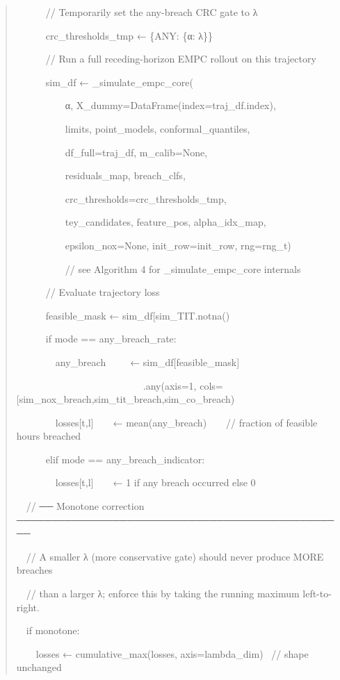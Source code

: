 \documentclass[11pt]{article}
\begin{document}
\begin{quote}
~~~~~~// Temporarily set the any-breach CRC gate to λ

~~~~~~crc\_thresholds\_tmp ← \{\textquotesingle ANY\textquotesingle:
\{α: λ\}\}

~~~~~~// Run a full receding-horizon EMPC rollout on this trajectory

~~~~~~sim\_df ← \_simulate\_empc\_core(

~~~~~~~~~~α, X\_dummy=DataFrame(index=traj\_df.index),

~~~~~~~~~~limits, point\_models, conformal\_quantiles,

~~~~~~~~~~df\_full=traj\_df, m\_calib=None,

~~~~~~~~~~residuals\_map, breach\_clfs,

~~~~~~~~~~crc\_thresholds=crc\_thresholds\_tmp,

~~~~~~~~~~tey\_candidates, feature\_pos, alpha\_idx\_map,

~~~~~~~~~~epsilon\_nox=None, init\_row=init\_row, rng=rng\_t)

~~~~~~~~~~// see Algorithm 4 for \_simulate\_empc\_core internals

~~~~~~// Evaluate trajectory loss

~~~~~~feasible\_mask ←
sim\_df{[}\textquotesingle sim\_TIT\textquotesingle{]}.notna()

~~~~~~if mode == \textquotesingle any\_breach\_rate\textquotesingle:

~~~~~~~~any\_breach~ ~ ~ ← sim\_df{[}feasible\_mask{]}

~~~~~~~~~~~~~~~~~~~~~~~~~~.any(axis=1,
cols={[}\textquotesingle sim\_nox\_breach\textquotesingle,\textquotesingle sim\_tit\_breach\textquotesingle,\textquotesingle sim\_co\_breach\textquotesingle{]})

~~~~~~~~losses{[}t,l{]} ~ ~ ← mean(any\_breach) ~ ~ // fraction of
feasible hours breached

~~~~~~elif mode ==
\textquotesingle any\_breach\_indicator\textquotesingle:

~~~~~~~~losses{[}t,l{]} ~ ~ ← 1 if any breach occurred else 0

~~// ── Monotone correction
────────────────────────────────────────────────

~~// A smaller λ (more conservative gate) should never produce MORE
breaches

~~// than a larger λ; enforce this by taking the running maximum
left-to-right.

~~if monotone:

~~~~losses ← cumulative\_max(losses, axis=lambda\_dim)~ // shape
unchanged


\end{quote}
\end{document}
